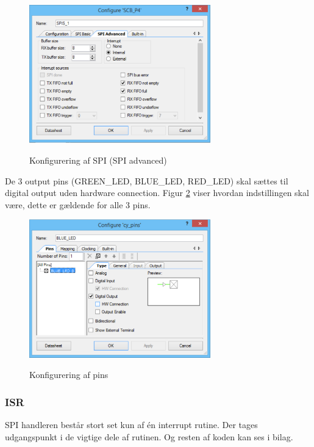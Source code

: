 \begin{figure}[H] \centering
{\includegraphics[width=0.7\textwidth]{filer/implementering/spi/spi_handler_topdesign_spi_advanced}}
\caption{Konfigurering af SPI (SPI advanced)}
\label{lab:spi_advanced_config}
\raggedright
\end{figure}

De 3 output pins (GREEN\_LED, BLUE\_LED, RED\_LED) skal sættes til digital output uden hardware connection.
Figur \ref{lab:led_pins_config} viser hvordan indstillingen skal være, dette er gældende for alle 3 pins. 

\begin{figure}[H] \centering
{\includegraphics[width=0.7\textwidth]{filer/implementering/spi/spi_handler_topdesign_led}}
\caption{Konfigurering af pins}
\label{lab:led_pins_config}
\raggedright
\end{figure}


\subsubsection*{ISR}

SPI handleren består stort set kun af én interrupt rutine. Der tages udgangspunkt i de vigtige dele af rutinen. Og resten af koden kan ses i bilag.

